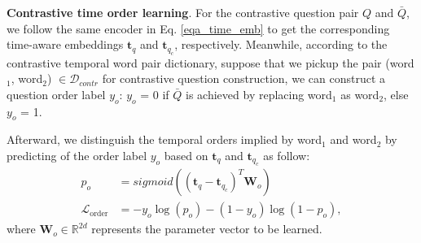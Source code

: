 \documentclass[11pt]{article}
\newcommand{\xhdr}[1]{{\noindent\bfseries #1}.}
\begin{document}




\xhdr{Contrastive time order learning} For the contrastive question pair $Q$ and $\bar{Q}$, we follow the same encoder in Eq. \ref{eqa_time_emb} to get the corresponding time-aware embeddings $\bm{t}_q$ and $\bm{t}_{q_c}$, respectively. Meanwhile, according to the contrastive temporal word pair dictionary, suppose that we pickup the pair (word$_1$, word$_2$) $\in \mathcal{D}_{contr}$ for contrastive question construction, we can construct a question order label $y_o$: $y_o$ = 0 if $\bar{Q}$ is achieved by replacing word$_1$ as word$_2$, else $y_o$ = 1.

Afterward, we distinguish the temporal orders implied by word$_1$ and word$_2$ by predicting of the order label $y_o$ based on $\bm{t}_q$ and $\bm{t}_{q_c}$ as follow:
\begin{align}
    p_o & = sigmoid((\bm{t}_{q} - \bm{t}_{q_c})^{T}\bm{W}_o)\\
    \mathcal{L}_{\text{order}} & = -{{y}_o \log(p_{o})} - {(1-{y}_o) \log(1-p_{o})},
\end{align}
where $\bm{W}_o \in \mathbb{R}^{2d}$ represents the parameter vector to be learned.


\end{document}
